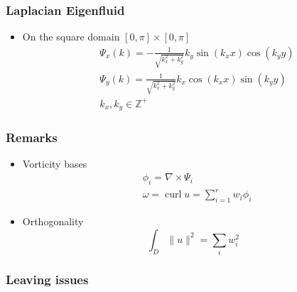 \documentclass[serif,mathserif, 12pt]{beamer}
\DeclareMathOperator{\curl}{curl}
\begin{document}
\begin{frame}
  \frametitle{Laplacian Eigenfluid}
  \begin{itemize}
  \item On the square domain $[0, \pi]\times [0, \pi]$
    \[
    \begin{split}
    &\Psi_x(k) = -\frac{1}{\sqrt{k_x^2+k_y^2}}k_y\sin(k_x x) \cos(k_y y) \\
      &\Psi_y(k) = \frac{1}{\sqrt{k_x^2+k_y^2}}k_x\cos(k_x x) \sin(k_y y) \\
      &k_x, k_y \in \mathbb{Z}^+
    \end{split} 
    \]
  \end{itemize}
\end{frame}

\begin{frame}
  \frametitle{Remarks}
  \begin{itemize}
  \item Vorticity bases
    \[
    \begin{split}
    &\phi_i = \nabla \times \Psi_i \\
    &\omega  = \curl u = \sum_{i=1}^r w_i \phi_i
    \end{split}
    \]
  \item Orthogonality
    \[
    \int_D \|u\|^2 = \sum_i w_i^2
    \]
  \end{itemize}
\end{frame}

\begin{frame}
  \frametitle{Leaving issues}
  
\end{frame}

\begin{frame} 
\end{frame}

\begin{frame} 
\end{frame}
\end{document}
